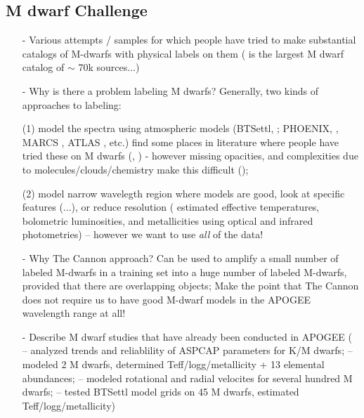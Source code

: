 \documentclass[modern]{aastex62}
\begin{document}
\subsection{M dwarf Challenge}
\begin{enumerate}
\item[-] Various attempts / samples for which people have tried to make substantial catalogs of M-dwarfs with physical labels on them (\citealt{West:2011} is the largest M dwarf catalog of $\sim$ 70k sources...) 

\item[-] Why is there a problem labeling M dwarfs? Generally, two kinds of approaches to labeling:

 (1) model the spectra using atmospheric models (BTSettl, \citealt{Allard:2011}; PHOENIX, \citealt{Husser:2013}, MARCS \citealt{Gustafsson:2008}, ATLAS \citealt{Castelli:2004}, etc.) find some places in literature where people have tried these on M dwarfs (\citealt{Rajpurohit:2014}, \citealt{Rajpurohit:2018}) - however missing opacities, and complexities due to molecules/clouds/chemistry make this difficult (\citealt{Allard:2013}); 

 (2) model narrow wavelegth region where models are good, look at specific features (\citealt{Rojas-Ayala:2012}...), or reduce resolution (\citealt{Casagrande:2008} estimated effective temperatures, bolometric luminosities, and metallicities using optical and infrared photometries) -- however we want to use \emph{all} of the data!


\item[-] Why The Cannon approach? Can be used to amplify a small number of labeled M-dwarfs in a training set into a huge number of labeled M-dwarfs, provided that there are overlapping objects; Make the point that The Cannon does not require us to have good M-dwarf models in the APOGEE wavelength range at all!

\item[-] Describe M dwarf studies that have already been conducted in APOGEE (\citealt{Schmidt:2016} -- analyzed trends and reliablility of ASPCAP parameters for K/M dwarfs; \citealt{Souto:2017} -- modeled 2 M dwarfs, determined Teff/logg/metallicity + 13 elemental abundances; \citealt{Desphande:2013} -- modeled rotational and radial velocites for several hundred M dwarfs; \citealt{Rajpurohit:2018} -- tested BTSettl model grids on 45 M dwarfs, estimated Teff/logg/metallicity)

\end{enumerate}
\end{document}
